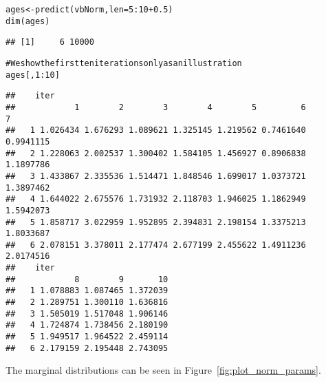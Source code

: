 \documentclass[a4paper,english,10pt]{article}\usepackage[]{graphicx}\usepackage[]{color}
\makeatletter
\newcommand{\hlnum}[1]{\textcolor[rgb]{0.2,0.2,0.2}{#1}}%
\newcommand{\hlcom}[1]{\textcolor[rgb]{0.2,0.267,0.4}{#1}}%
\newcommand{\hlopt}[1]{\textcolor[rgb]{0.2,0.2,0.2}{#1}}%
\newcommand{\hlstd}[1]{\textcolor[rgb]{0,0,0}{#1}}%
\newcommand{\hlkwb}[1]{\textcolor[rgb]{0.361,0.506,0.596}{#1}}%
\newcommand{\hlkwc}[1]{\textcolor[rgb]{0.361,0.506,0.596}{#1}}%
\newcommand{\hlkwd}[1]{\textcolor[rgb]{0.361,0.506,0.596}{#1}}%
\newenvironment{kframe}{%
 \def\at@end@of@kframe{}%
 \ifinner\ifhmode%
  \def\at@end@of@kframe{\end{minipage}}%
  \begin{minipage}{\columnwidth}%
 \fi\fi%
 \def\FrameCommand##1{\hskip\@totalleftmargin \hskip-\fboxsep
 \colorbox{shadecolor}{##1}\hskip-\fboxsep
     \hskip-\linewidth \hskip-\@totalleftmargin \hskip\columnwidth}%
 \MakeFramed {\advance\hsize-\width
   \@totalleftmargin\z@ \linewidth\hsize
   \@setminipage}}%
 {\par\unskip\endMakeFramed%
 \at@end@of@kframe}
\newenvironment{knitrout}{}{} %
\makeatother
\begin{document}
\begin{knitrout}
\color{fgcolor}\begin{kframe}
\begin{alltt}
\hlstd{ages} \hlkwb{<-} \hlkwd{predict}\hlstd{(vbNorm,} \hlkwc{len}\hlstd{=}\hlnum{5}\hlopt{:}\hlnum{10}\hlopt{+}\hlnum{0.5}\hlstd{)}
\hlkwd{dim}\hlstd{(ages)}
\end{alltt}
\begin{verbatim}
## [1]     6 10000
\end{verbatim}
\begin{alltt}
\hlcom{# We show the first ten iterations only as an illustration}
\hlstd{ages[,}\hlnum{1}\hlopt{:}\hlnum{10}\hlstd{]}
\end{alltt}
\begin{verbatim}
##    iter
##            1        2        3        4        5         6         7
##   1 1.026434 1.676293 1.089621 1.325145 1.219562 0.7461640 0.9941115
##   2 1.228063 2.002537 1.300402 1.584105 1.456927 0.8906838 1.1897786
##   3 1.433867 2.335536 1.514471 1.848546 1.699017 1.0373721 1.3897462
##   4 1.644022 2.675576 1.731932 2.118703 1.946025 1.1862949 1.5942073
##   5 1.858717 3.022959 1.952895 2.394831 2.198154 1.3375213 1.8033687
##   6 2.078151 3.378011 2.177474 2.677199 2.455622 1.4911236 2.0174516
##    iter
##            8        9       10
##   1 1.078883 1.087465 1.372039
##   2 1.289751 1.300110 1.636816
##   3 1.505019 1.517048 1.906146
##   4 1.724874 1.738456 2.180190
##   5 1.949517 1.964522 2.459114
##   6 2.179159 2.195448 2.743095
\end{verbatim}
\end{kframe}
\end{knitrout}

The marginal distributions can be seen in Figure~\ref{fig:plot_norm_params}.
\end{document}
